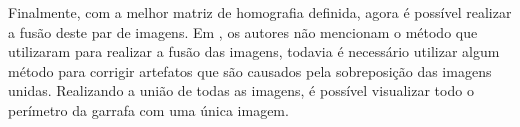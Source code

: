 Finalmente, com a melhor matriz de homografia definida, agora é possível realizar a fusão deste par de imagens. Em \cite{Lin:2013}, os autores não mencionam o método que utilizaram 
para realizar a fusão das imagens, todavia é necessário utilizar algum método para corrigir artefatos que são causados pela sobreposição das imagens unidas. Realizando a união de todas as imagens, é possível visualizar todo o perímetro da garrafa com uma única imagem.


